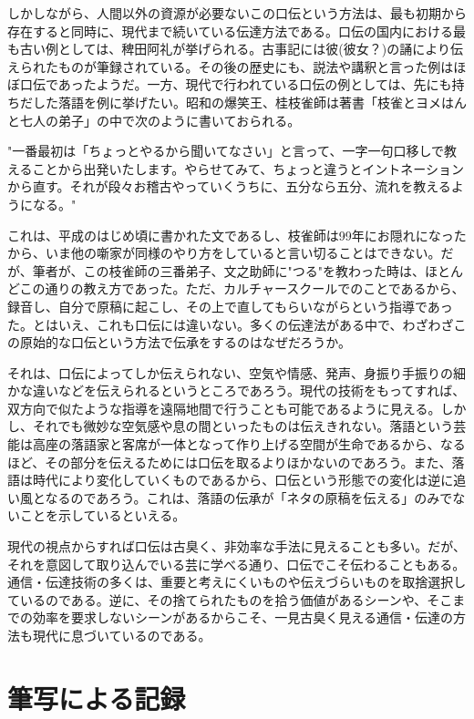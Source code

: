 しかしながら、人間以外の資源が必要ないこの口伝という方法は、最も初期から存在すると同時に、現代まで続いている伝達方法である。口伝の国内における最も古い例としては、稗田阿礼が挙げられる。古事記には彼(彼女？)の誦により伝えられたものが筆録されている。その後の歴史にも、説法や講釈と言った例はほぼ口伝であったようだ。一方、現代で行われている口伝の例としては、先にも持ちだした落語を例に挙げたい。昭和の爆笑王、桂枝雀師は著書「枝雀とヨメはんと七人の弟子」の中で次のように書いておられる。

"一番最初は「ちょっとやるから聞いてなさい」と言って、一字一句口移しで教えることから出発いたします。やらせてみて、ちょっと違うとイントネーションから直す。それが段々お稽古やっていくうちに、五分なら五分、流れを教えるようになる。"

これは、平成のはじめ頃に書かれた文であるし、枝雀師は99年にお隠れになったから、いま他の噺家が同様のやり方をしていると言い切ることはできない。だが、筆者が、この枝雀師の三番弟子、文之助師に"つる"を教わった時は、ほとんどこの通りの教え方であった。ただ、カルチャースクールでのことであるから、録音し、自分で原稿に起こし、その上で直してもらいながらという指導であった。とはいえ、これも口伝には違いない。多くの伝達法がある中で、わざわざこの原始的な口伝という方法で伝承をするのはなぜだろうか。

それは、口伝によってしか伝えられない、空気や情感、発声、身振り手振りの細かな違いなどを伝えられるというところであろう。現代の技術をもってすれば、双方向で似たような指導を遠隔地間で行うことも可能であるように見える。しかし、それでも微妙な空気感や息の間といったものは伝えきれない。落語という芸能は高座の落語家と客席が一体となって作り上げる空間が生命であるから、なるほど、その部分を伝えるためには口伝を取るよりほかないのであろう。また、落語は時代により変化していくものであるから、口伝という形態での変化は逆に追い風となるのであろう。これは、落語の伝承が「ネタの原稿を伝える」のみでないことを示しているといえる。

現代の視点からすれば口伝は古臭く、非効率な手法に見えることも多い。だが、それを意図して取り込んでいる芸に学べる通り、口伝でこそ伝わることもある。通信・伝達技術の多くは、重要と考えにくいものや伝えづらいものを取捨選択しているのである。逆に、その捨てられたものを拾う価値があるシーンや、そこまでの効率を要求しないシーンがあるからこそ、一見古臭く見える通信・伝達の方法も現代に息づいているのである。


\section{筆写による記録}

